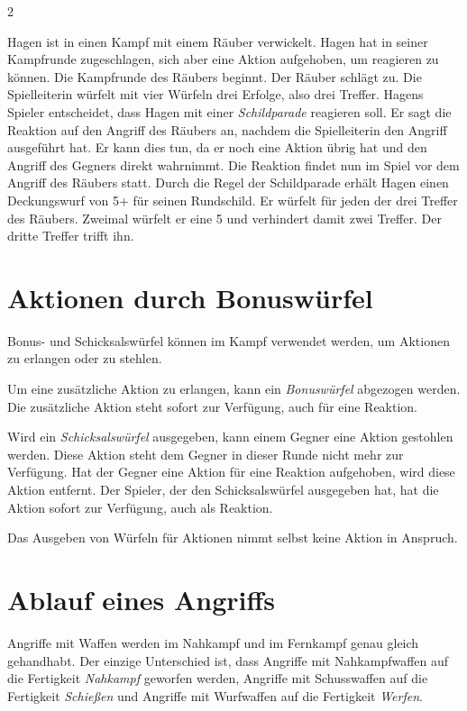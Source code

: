 \begin{multicols}{2}
\begin{pexample}[Beispiel]
Hagen ist in einen Kampf mit einem Räuber verwickelt. Hagen hat in seiner Kampfrunde zugeschlagen, sich aber eine Aktion aufgehoben, um reagieren zu können.
Die Kampfrunde des Räubers beginnt. Der Räuber schlägt zu. Die Spielleiterin würfelt mit vier Würfeln drei Erfolge, also drei Treffer.
Hagens Spieler entscheidet, dass Hagen mit einer \textit{Schildparade} reagieren soll. Er sagt die Reaktion auf den Angriff des Räubers an, nachdem die Spielleiterin den Angriff ausgeführt hat. Er kann dies tun, da er noch eine Aktion übrig hat und den Angriff des Gegners direkt wahrnimmt.
Die Reaktion findet nun im Spiel vor dem Angriff des Räubers statt. Durch die Regel der Schildparade erhält Hagen einen Deckungswurf von 5+ für seinen Rundschild. Er würfelt für jeden der drei Treffer des Räubers. Zweimal würfelt er eine 5 und verhindert damit zwei Treffer. Der dritte Treffer trifft ihn.
\end{pexample}

\section{Aktionen durch Bonuswürfel}

Bonus- und Schicksalswürfel können im Kampf verwendet werden, um Aktionen zu erlangen oder zu stehlen.

Um eine zusätzliche Aktion zu erlangen, kann ein \textit{Bonuswürfel} abgezogen werden. Die zusätzliche Aktion steht sofort zur Verfügung, auch für eine Reaktion.

Wird ein \textit{Schicksalswürfel} ausgegeben, kann einem Gegner eine Aktion gestohlen werden. Diese Aktion steht dem Gegner in dieser Runde nicht mehr zur Verfügung. Hat der Gegner eine Aktion für eine Reaktion aufgehoben, wird diese Aktion entfernt. Der Spieler, der den Schicksalswürfel ausgegeben hat, hat die Aktion sofort zur Verfügung, auch als Reaktion.

Das Ausgeben von Würfeln für Aktionen nimmt selbst keine Aktion in Anspruch.

\section{Ablauf eines Angriffs}

Angriffe mit Waffen werden im Nahkampf und im Fernkampf genau gleich gehandhabt. Der einzige Unterschied ist, dass Angriffe mit Nahkampfwaffen auf die Fertigkeit \textit{Nahkampf} geworfen werden, Angriffe mit Schusswaffen auf die Fertigkeit \textit{Schießen} und Angriffe mit Wurfwaffen auf die Fertigkeit \textit{Werfen}.


\end{multicols}
